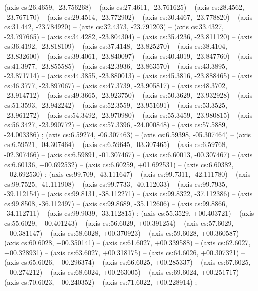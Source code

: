     (axis cs:26.4659,    -23.756268) --  (axis cs:27.4611,    -23.761625) --  (axis cs:28.4562,    -23.767170) --  (axis cs:29.4514,    -23.772902) --  (axis cs:30.4467,    -23.778820) --  (axis cs:31.442,    -23.784920) --  (axis cs:32.4373,    -23.791203) --  (axis cs:33.4327,    -23.797665) --  (axis cs:34.4282,    -23.804304) --  (axis cs:35.4236,    -23.811120) --  (axis cs:36.4192,    -23.818109) --  (axis cs:37.4148,    -23.825270) --  (axis cs:38.4104,    -23.832600) --  (axis cs:39.4061,    -23.840097) --  (axis cs:40.4019,    -23.847760) --  (axis cs:41.3977,    -23.855585) --  (axis cs:42.3936,    -23.863570) --  (axis cs:43.3895,    -23.871714) --  (axis cs:44.3855,    -23.880013) --  (axis cs:45.3816,    -23.888465) --  (axis cs:46.3777,    -23.897067) --  (axis cs:47.3739,    -23.905817) --  (axis cs:48.3702,    -23.914712) --  (axis cs:49.3665,    -23.923750) --  (axis cs:50.3629,    -23.932928) --  (axis cs:51.3593,    -23.942242) --  (axis cs:52.3559,    -23.951691) --  (axis cs:53.3525,    -23.961272) --  (axis cs:54.3492,    -23.970980) --  (axis cs:55.3459,    -23.980815) --  (axis cs:56.3427,    -23.990772) --  (axis cs:57.3396,    -24.000848) --  (axis cs:57.5889,    -24.003386) ;
    (axis cs:6.59274,    -06.307463) --  (axis cs:6.59398,    -05.307464) --  (axis cs:6.59521,    -04.307464) --  (axis cs:6.59645,    -03.307465) --  (axis cs:6.59768,    -02.307466) --  (axis cs:6.59891,    -01.307467) --  (axis cs:6.60013,    -00.307467) --  (axis cs:6.60136,    +00.692532) --  (axis cs:6.60259,    +01.692531) --  (axis cs:6.60382,    +02.692530) ;
    (axis cs:99.709,    -43.111647) --  (axis cs:99.7311,    -42.111780) --  (axis cs:99.7525,    -41.111908) --  (axis cs:99.7733,    -40.112033) --  (axis cs:99.7935,    -39.112154) --  (axis cs:99.8131,    -38.112271) --  (axis cs:99.8322,    -37.112386) --  (axis cs:99.8508,    -36.112497) --  (axis cs:99.8689,    -35.112606) --  (axis cs:99.8866,    -34.112711) --  (axis cs:99.9039,    -33.112815) ;
    (axis cs:55.3529,    +00.403721) --  (axis cs:55.6029,    +00.401243) --  (axis cs:56.6029,    +00.391254) --  (axis cs:57.6029,    +00.381147) --  (axis cs:58.6028,    +00.370923) --  (axis cs:59.6028,    +00.360587) --  (axis cs:60.6028,    +00.350141) --  (axis cs:61.6027,    +00.339588) --  (axis cs:62.6027,    +00.328931) --  (axis cs:63.6027,    +00.318175) --  (axis cs:64.6026,    +00.307321) --  (axis cs:65.6026,    +00.296374) --  (axis cs:66.6025,    +00.285337) --  (axis cs:67.6025,    +00.274212) --  (axis cs:68.6024,    +00.263005) --  (axis cs:69.6024,    +00.251717) --  (axis cs:70.6023,    +00.240352) --  (axis cs:71.6022,    +00.228914) ;
